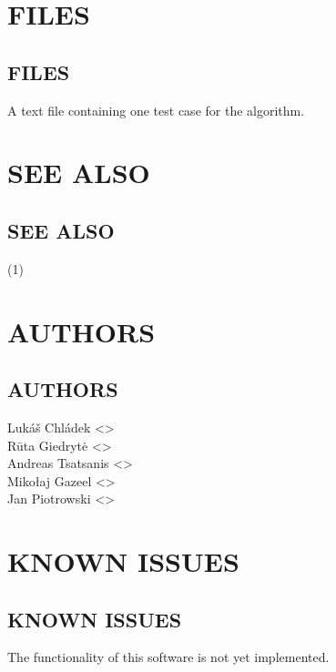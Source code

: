 \documentclass[a4paper,english]{article}
\begin{document}
  \section*{FILES}
    \begin{adjustwidth}{18pt}{0pt}
  \section{FILES}

    \begin{Description}[Files]\setlength{\itemsep}{0cm}
        \item[\File{./text\_0}] A text file containing one test case for the algorithm.
    \end{Description}

    \end{adjustwidth}


  \section*{SEE ALSO}
    \begin{adjustwidth}{18pt}{0pt}
  \section{SEE ALSO}
      (1)
    \end{adjustwidth}

  \section*{AUTHORS}
    \begin{adjustwidth}{18pt}{0pt}
  \section{AUTHORS}
    Lukáš Chládek <>\\[0.1cm]\MANbr
    Rūta Giedrytė <>\\[0.1cm]\MANbr
    Andreas Tsatsanis <>\\[0.1cm]\MANbr
    Mikołaj Gazeel <>\\[0.1cm]\MANbr
    Jan Piotrowski <>
    \end{adjustwidth}

  \section*{KNOWN ISSUES}
    \begin{adjustwidth}{18pt}{0pt}
  \section{KNOWN ISSUES}
      The functionality of this software is not yet implemented.
    \end{adjustwidth}
\end{document}
